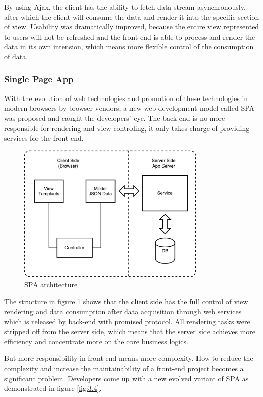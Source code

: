 By using Ajax, the client has the ability to fetch data stream asynchronously, after which the client will consume the data and render it into the specific section of view. Usability was dramatically improved, because the entire view represented to users will not be refreshed and the front-end is able to process and render the data in its own intension, which means more flexible control of the consumption of data.

\subsubsection{Single Page App}

With the evolution of web technologies and promotion of these technologies in modern browsers by browser vendors, a new web development model called \gls{SPA} was proposed and caught the developers' eye. The back-end is no more responsible for rendering and view controling, it only takes charge of providing services for the front-end.

\begin{figure}[!htbp]
  \centering
    \includegraphics[width=0.8\textwidth]{Figures/tech-web-arch-spa.pdf}
  \caption{SPA architecture}
  \label{fig:3.3}
\end{figure}

The structure in figure \ref{fig:3.3} shows that the client side has the full control of view rendering and data consumption after data acquisition through web services which is released by back-end with promised protocol. All rendering tasks were stripped off from the server side, which means that the server side achieves more efficiency and concentrate more on the core business logics.

But more responsibility in front-end means more complexity. How to reduce the complexity and increase the maintainability of a front-end project becomes a significant problem. Developers come up with a new evolved variant of SPA as demonstrated in figure \ref{fig:3.4}.

